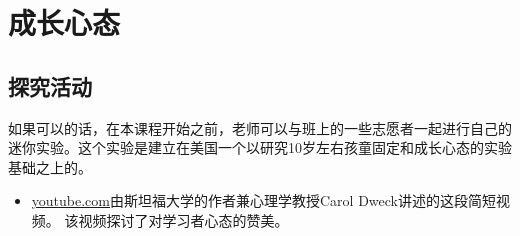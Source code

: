 \chapter{成长心态}

\section{探究活动}
    如果可以的话，在本课程开始之前，老师可以与班上的一些志愿者一起进行自己的迷你实验。这个实验是建立在美国一个以研究10岁左右孩童固定和成长心态的实验基础之上的。
    \begin{itemize}
      \item \href{http://www.youtube.com/watch?v=TTXrV0_3UjY}{youtube.com}由斯坦福大学的作者兼心理学教授Carol Dweck讲述的这段简短视频。 该视频探讨了对学习者心态的赞美。    
    \end{itemize}  
    
